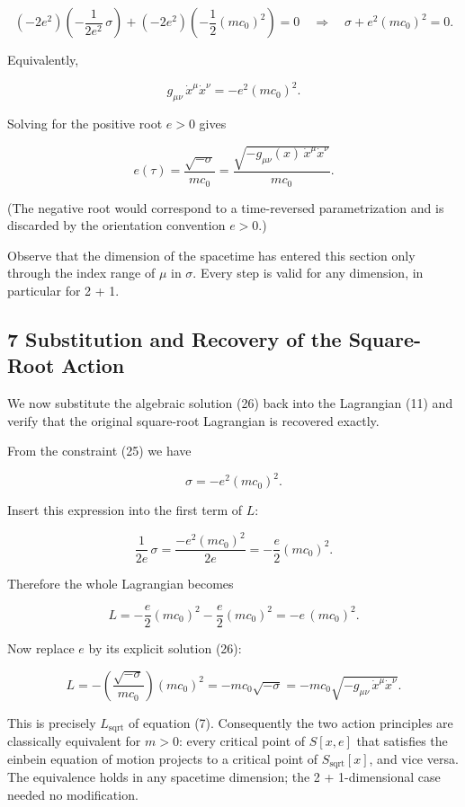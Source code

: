 \documentclass[
]{article}
\begin{document}
\[\left( -2e^{2} \right) \left( - \frac{1}{2e^{2}}\, \sigma \right) + \left( -2e^{2} \right) \left( - \frac{1}{2}(mc_{0})^{2} \right) = 0
\quad \Longrightarrow \quad \sigma + e^{2}(mc_{0})^{2} = 0. \tag{24}\]

Equivalently,

\[g_{\mu\nu}\, \dot{x}^{\mu} \dot{x}^{\nu} = - e^{2} (mc_{0})^{2}. \tag{25}\]

Solving for the positive root \(e > 0\) gives

\[e(\tau) = \frac{\sqrt{-\sigma}}{mc_{0}} = \frac{\sqrt{-g_{\mu\nu}(x)\, \dot{x}^{\mu} \dot{x}^{\nu}}}{mc_{0}}. \tag{26}\]

(The negative root would correspond to a time-reversed parametrization
and is discarded by the orientation convention \(e > 0\).)

Observe that the dimension of the spacetime has entered this section
only through the index range of \(\mu\) in \(\sigma\). Every step is
valid for any dimension, in particular for 2 + 1.

\hypertarget{substitution-and-recovery-of-the-square-root-action}{%
\subsection{7 Substitution and Recovery of the Square-Root
Action}\label{substitution-and-recovery-of-the-square-root-action}}

We now substitute the algebraic solution (26) back into the Lagrangian
(11) and verify that the original square-root Lagrangian is recovered
exactly.

From the constraint (25) we have

\[\sigma = - e^{2} (mc_{0})^{2}. \tag{27}\]

Insert this expression into the first term of \(L\):

\[\frac{1}{2e}\, \sigma = \frac{-e^{2}(mc_{0})^{2}}{2e} = - \frac{e}{2}(mc_{0})^{2}. \tag{28}\]

Therefore the whole Lagrangian becomes

\[L = - \frac{e}{2}(mc_{0})^{2} - \frac{e}{2}(mc_{0})^{2} = - e\, (mc_{0})^{2}. \tag{29}\]

Now replace \(e\) by its explicit solution (26):

\[L = - \left( \frac{\sqrt{-\sigma}}{mc_{0}} \right) (mc_{0})^{2} = - mc_{0} \sqrt{-\sigma} = - mc_{0} \sqrt{-g_{\mu\nu}\, \dot{x}^{\mu} \dot{x}^{\nu}}. \tag{30}\]

This is precisely \(L_{\mathrm{sqrt}}\) of equation (7). Consequently
the two action principles are classically equivalent for \(m > 0\):
every critical point of \(S[x, e]\) that satisfies the einbein equation
of motion projects to a critical point of \(S_{\mathrm{sqrt}}[x]\), and
vice versa. The equivalence holds in any spacetime dimension; the 2 +
1-dimensional case needed no modification.
\end{document}
